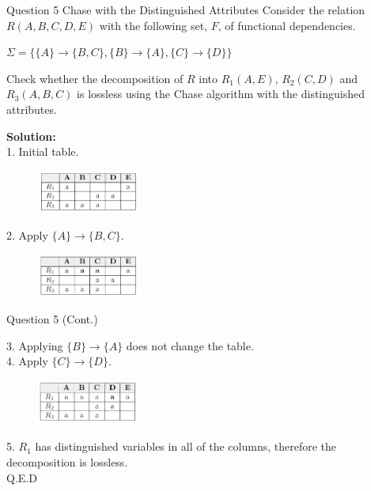 \begin{frame}[fragile]{Question 5 Chase with the Distinguished Attributes}
	Consider the relation $R(A,B,C,D,E)$ with the following set, $F$, of functional dependencies.\\ \vspace{5pt}
	
	$\Sigma=\{\{A\}\rightarrow\{B,C\}, \{B\}\rightarrow\{A\},\{C\}\rightarrow\{D\}\}$\\ \vspace{5pt}
	
	Check whether the decomposition of $R$ into $R_1(A,E)$, $R_2(C,D)$ and $R_3(A,B,C)$ is lossless using the Chase algorithm with the distinguished attributes.\\ \vspace{5pt}
	
	\textbf{Solution:}\\ \vspace{2pt}
	1. Initial table.\\
	\begin{figure}
		\includegraphics[width=0.3\textwidth, trim=0 0 0 0, clip]{4221-t5/images/5-1.png}
	\end{figure}
	
	2. Apply $\{A\} \rightarrow \{B,C\}$.\\
	\begin{figure}
		\includegraphics[width=0.3\textwidth, trim=0 0 0 0, clip]{4221-t5/images/5-2.png}
	\end{figure}
	
\end{frame}
\begin{frame}[fragile]{Question 5 (Cont.)}
	
	3. Applying $\{B\} \rightarrow \{A\}$ does not change the table.\\
	4. Apply $\{C\} \rightarrow \{D\}$.\\
	\begin{figure}
		\includegraphics[width=0.3\textwidth, trim=0 0 0 0, clip]{4221-t5/images/5-4.png}
	\end{figure}

	5. $R_1$ has distinguished variables in all of the columns, therefore the decomposition is lossless.\\
	\hfill Q.E.D
\end{frame}

